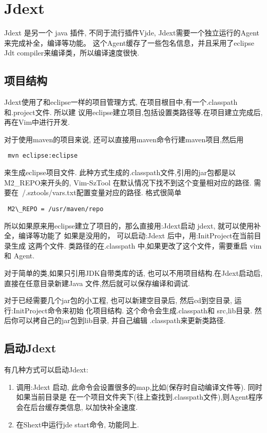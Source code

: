 \documentclass[oneside,openany]{book}
\begin{document}
\section{Jdext}
  Jdext 是另一个 java 插件, 不同于流行插件Vjde, Jdext需要一个独立运行的Agent来完成补全，编译等功能。
这个Agent缓存了一些包名信息，并且采用了eclipse Jdt compiler来编译类，所以编译速度很快. 

\subsection{项目结构}
    Jdext使用了和eclipse一样的项目管理方式, 在项目根目中,有一个.classpath和.project文件. 所以建
议用eclipse建立项目,包括设置类路径等.在项目建立完成后, 再在Vim中进行开发.

   对于使用maven的项目来说, 还可以直接用maven命令行建maven项目,然后用
  \begin{verbatim} mvn eclipse:eclipse \end{verbatim}
  来生成eclipse项目文件. 此种方式生成的.classpath文件,引用的jar包都是以M2\_REPO来开头的, Vim-SzTool
在默认情况下找不到这个变量相对应的路径. 需要在~/.sztools/vars.txt配置变量对应的路径. 格式很简单
  \begin{verbatim} M2\_REPO = /usr/maven/repo \end{verbatim}
所以如果原来用eclipse建立了项目的，那么直接用:Jdext启动 jdext, 就可以使用补全，编译等功能了
如果是没用的， 可以启动:Jdext 后中，用:InitProject在当前目录生成 这两个文件. 类路径的在.classpath 
中,如果更改了这个文件，需要重启 vim和 Agent. 

   对于简单的类,如果只引用JDK自带类库的话, 也可以不用项目结构.在Jdext启动后,直接在任意目录新建Java
文件,然后就可以保存编译和调试.
  
   对于已经需要几个jar包的小工程, 也可以新建空目录后, 然后cd到空目录, 运行:InitProject命令来初始
化项目结构. 这个命令会生成.classpath和 src,lib目录. 然后你可以拷自己的jar包到lib目录, 并自己编辑
.classpath来更新类路径.

\subsection{启动Jdext}
   有几种方式可以启动Jdext:
    \begin{enumerate}
      \item 调用:Jdext 启动, 此命令会设置很多的map,比如(保存时自动编译文件等). 同时如果当前目录是
  在一个项目文件夹下(往上查找到.classpath文件),则Agent程序会在后台缓存类信息, 以加快补全速度.
      \item 在Shext中运行jde start命令, 功能同上.
    \end{enumerate}
\end{document}

